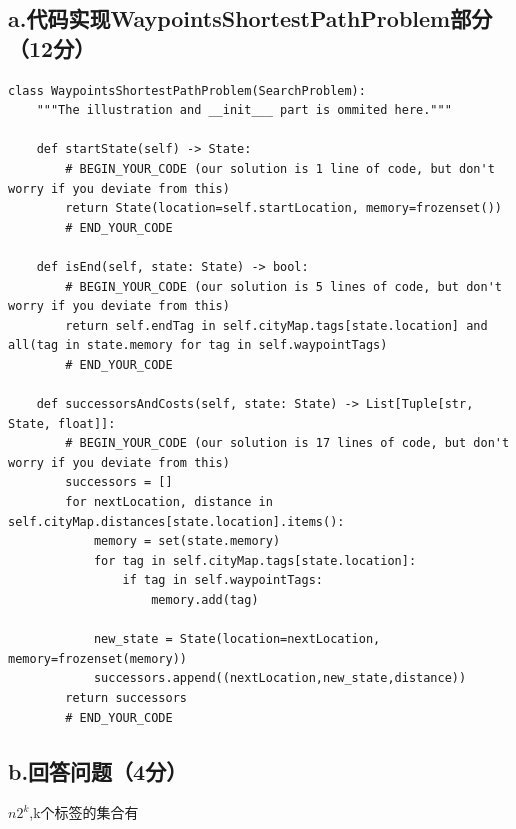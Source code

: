 \documentclass{article}
\begin{document}
\subsection*{a.代码实现WaypointsShortestPathProblem部分（12分）}
 
 \begin{lstlisting}
class WaypointsShortestPathProblem(SearchProblem):
    """The illustration and __init___ part is ommited here."""

    def startState(self) -> State:
        # BEGIN_YOUR_CODE (our solution is 1 line of code, but don't worry if you deviate from this)
        return State(location=self.startLocation, memory=frozenset())
        # END_YOUR_CODE

    def isEnd(self, state: State) -> bool:
        # BEGIN_YOUR_CODE (our solution is 5 lines of code, but don't worry if you deviate from this)
        return self.endTag in self.cityMap.tags[state.location] and all(tag in state.memory for tag in self.waypointTags)
        # END_YOUR_CODE

    def successorsAndCosts(self, state: State) -> List[Tuple[str, State, float]]:
        # BEGIN_YOUR_CODE (our solution is 17 lines of code, but don't worry if you deviate from this)
        successors = []
        for nextLocation, distance in self.cityMap.distances[state.location].items():
            memory = set(state.memory)
            for tag in self.cityMap.tags[state.location]:
                if tag in self.waypointTags:
                    memory.add(tag)
        
            new_state = State(location=nextLocation, memory=frozenset(memory))
            successors.append((nextLocation,new_state,distance))
        return successors
        # END_YOUR_CODE
\end{lstlisting}

\subsection*{b.回答问题（4分）}
$n2^{k}$,k个标签的集合有
\end{document}
